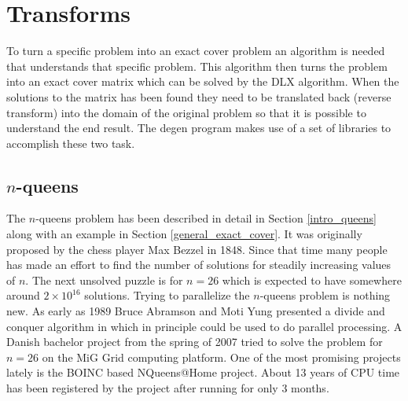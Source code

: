 \section{Transforms}
\label{transforms}

To turn a specific problem into an exact cover problem an algorithm is needed that understands that specific problem.
This algorithm then turns the problem into an exact cover matrix which can be solved by the DLX algorithm.
When the solutions to the matrix has been found they need to be translated back (reverse transform) into the domain of the original problem so that it is possible to understand the end result.
The degen program makes use of a set of libraries to accomplish these two task.


\subsection{\texorpdfstring{$n$}{n}-queens}
\label{queens_trans}

The $n$-queens problem has been described in detail in Section \ref{intro_queens} along with an example in Section \ref{general_exact_cover}.
It was originally proposed by the chess player Max Bezzel in 1848.
Since that time many people has made an effort to find the number of solutions for steadily increasing values of $n$.
The next unsolved puzzle is for $n = 26$ which is expected to have somewhere around $2 \times 10^{16}$ solutions.
Trying to parallelize the $n$-queens problem is nothing new.
As early as 1989 Bruce Abramson and Moti Yung presented a divide and conquer algorithm in \cite{Abramson89} which in principle could be used to do parallel processing.
A Danish bachelor project from the spring of 2007 \cite{queens-mig} tried to solve the problem for $n=26$ on the MiG \cite{mig} Grid computing platform.
One of the most promising projects lately is the BOINC based NQueens@Home \cite{nqueensathome} project.
About 13 years of CPU time has been registered by the project after running for only 3 months.

